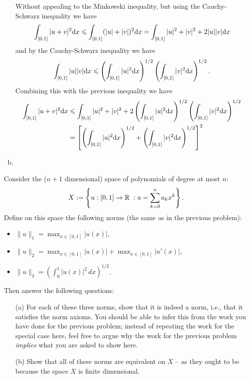 \documentclass[12pt]{memoir}
\begin{document}
\begin{ptcbr}
\begin{enumerate}[(a)]
    Without appealing to the Minkowski inequality, but using the Cauchy-Schwarz inequality we have 
    $$\int_{\left\lbrack0,1\right\rbrack}|u+v|^2\dd x\leqslant \int_{\left\lbrack0,1\right\rbrack}(|u|+|v|)^2\dd x=\int_{\left\lbrack0,1\right\rbrack}|u|^2+|v|^2+2|u||v|\dd x$$
    and by the Cauchy-Schwarz inequality we have 
    $$\int_{\left\lbrack0,1\right\rbrack}|u||v|\dd x\leqslant\left(\int_{\left\lbrack0,1\right\rbrack}|u|^2\dd x\right)^{1/2}\left(\int_{\left\lbrack0,1\right\rbrack}|v|^2\dd x\right)^{1/2}.$$
    Combining this with the previous inequality we have
    \begin{align*}
    \int_{\left\lbrack0,1\right\rbrack}|u+v|^2\dd x&\leqslant \int_{\left\lbrack0,1\right\rbrack}|u|^2+|v|^2+2\left(\int_{\left\lbrack0,1\right\rbrack}|u|^2\dd x\right)^{1/2}\left(\int_{\left\lbrack0,1\right\rbrack}|v|^2\dd x\right)^{1/2}\\
    &=\left\lbrack\left(\int_{\left\lbrack0,1\right\rbrack}|u|^2\dd x\right)^{1/2}+\left(\int_{\left\lbrack0,1\right\rbrack}|v|^2\dd x\right)^{1/2}\right\rbrack^2
    \end{align*}%
    \item {}
\end{enumerate}
\end{ptcbr}
\begin{Ej}
    Consider the ($n+1$ dimensional) space of polynomials of degree at most $n$:
\begin{align*}
  X := \left\{ 
   u : [0,1] \rightarrow \mathbb{R} \; :
   u=\sum_{k=0}^n a_k x^k
  \right\}.
\end{align*}
Define on this space the following norms (the same as in the previous problem):
\begin{itemize}
\item $\|u\|_1 = \max_{x \in [0,1]} |u(x)|$,
\item $\|u\|_2 = \max_{x \in [0,1]} |u(x)| + \max_{x \in [0,1]}
  |u'(x)|$,
\item $\|u\|_3 = \left(\int_0^1 |u(x)|^2 \, dx\right)^{1/2}$.
\end{itemize}
Then answer the following questions:
\begin{itemize}
\item[(a)] For each of these three norms, show that it is indeed a
  norm, i.e., that it satisfies the norm axioms. You should be able to
  infer this from the work you have done for the previous problem;
  instead of repeating the work for the special case here, feel free
  to argue why the work for the previous problem \textit{implies} what you are
  asked to show here.
\item[(b)] Show that all of these norms are equivalent on $X$ -- as they
  ought to be because the space $X$ is finite dimensional.
\end{itemize}
\end{Ej}
\end{document}
